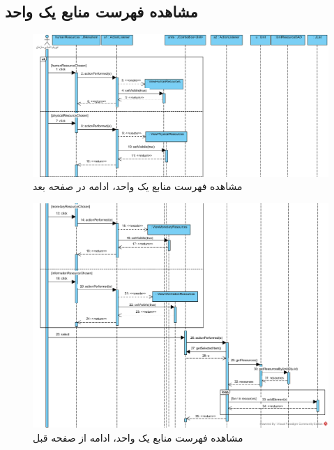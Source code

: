 \begin{landscape}
\section{مشاهده فهرست منابع یک واحد}
\begin{figure}[H]
	\centering
	\includegraphics[scale=0.7]{img/sequence-design/ViewListOfResources-1}
	\caption{مشاهده فهرست منابع یک واحد، ادامه در صفحه بعد}
\end{figure}
\begin{figure}[H]
	\centering
	\includegraphics[scale=0.7]{img/sequence-design/ViewListOfResources-2}
	\caption{مشاهده فهرست منابع یک واحد، ادامه از صفحه قبل}
\end{figure}
\begin{figure}[H]
	\centering

\end{figure}
\end{landscape}
